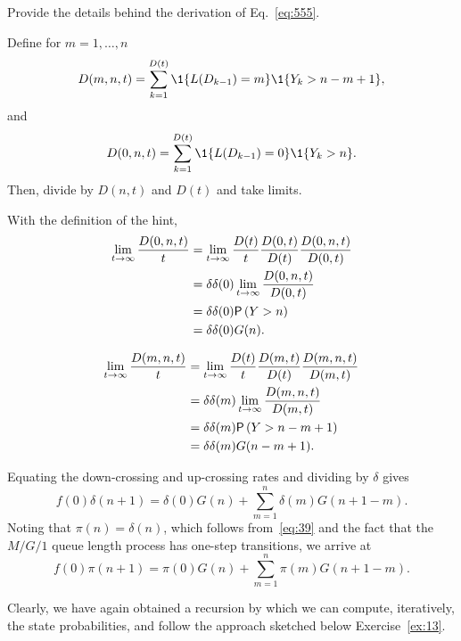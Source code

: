 \begin{exercise}
Provide the details behind the derivation of Eq.~\ref{eq:555}.
\begin{hint}
Define for $m=1,\ldots, n$
\begin{equation*}
  D(m, n, t) = \sum_{k=1}^{D(t)}\1{L(D_{k-1})=m}\1{Y_k>n-m+1},
\end{equation*}
and 
\begin{equation*}
  D(0, n, t) = \sum_{k=1}^{D(t)}\1{L(D_{k-1})=0}\1{Y_k>n}.
\end{equation*}
Then, divide by $D(n,t)$ and $D(t)$ and take limits.
\end{hint}
\begin{solution}
With the definition of the hint, 
\begin{align*}
  \lim_{t\to\infty} \frac{  D(0, n, t)}t 
&=   \lim_{t\to\infty}  \frac{D(t)}t \frac{D(0, t)}{D(t)}\frac{ D(0, n, t)}{D(0,t)} \\
&=   \delta \delta(0) \lim_{t\to\infty} \frac{ D(0, n, t)}{D(0,t)} \\
&=   \delta \delta(0) \P{Y>n}\\
& = \delta \delta(0) G(n).
\end{align*}

\begin{align*}
  \lim_{t\to\infty} \frac{  D(m, n, t)}t 
&=   \lim_{t\to\infty}  \frac{D(t)}t \frac{D(m, t)}{D(t)}\frac{ D(m, n, t)}{D(m,t)} \\
&=   \delta \delta(m) \lim_{t\to\infty} \frac{ D(m, n, t)}{D(m,t)} \\
&=   \delta \delta(m) \P{Y>n-m+1}\\
& = \delta \delta(m) G(n-m+1).
\end{align*}
\end{solution}
\end{exercise}

Equating the down-crossing and up-crossing rates and dividing
by $\delta$ gives
\begin{equation*}
  f(0) \delta(n+1) = \delta(0) G(n) + \sum_{m=1}^{n} \delta(m) G(n+1-m).
\end{equation*}
Noting that $\pi(n) = \delta(n)$, which follows from~\eqref{eq:39} and
the fact that the $M/G/1$ queue length process has one-step
transitions, we arrive at
\begin{equation}\label{eq:72}
  f(0) \pi(n+1) = \pi(0) G(n) + \sum_{m=1}^{n} \pi(m) G(n+1-m).
\end{equation}

Clearly, we have  again obtained a recursion by which we can compute, iteratively, the
state probabilities, and follow the approach sketched below Exercise~\ref{ex:13}. 



